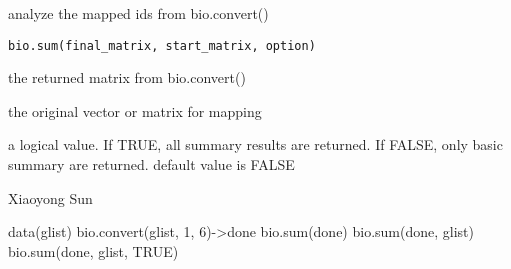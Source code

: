 \begin{Description}\relax
analyze the mapped ids from bio.convert()
\end{Description}
\begin{Usage}
\begin{verbatim}
bio.sum(final_matrix, start_matrix, option)
\end{verbatim}
\end{Usage}
\begin{Arguments}
\begin{ldescription}
\item[\code{final\_matrix}] the returned matrix from bio.convert()
\item[\code{start\_matrix}] the original vector or matrix for mapping 
\item[\code{option}] a logical value. If TRUE, all summary results are returned. If FALSE, only basic summary are returned. default value is FALSE 
\end{ldescription}
\end{Arguments}
\begin{Author}\relax
Xiaoyong Sun
\end{Author}
\begin{Examples}
\begin{ExampleCode}

data(glist)
bio.convert(glist, 1, 6)->done
bio.sum(done)
bio.sum(done, glist)
bio.sum(done, glist, TRUE)
\end{ExampleCode}
\end{Examples}

